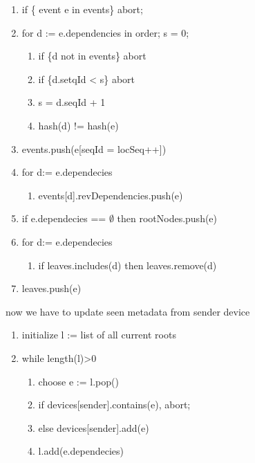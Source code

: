 \begin{enumerate}
    \item if \{ event e in events\} abort;
    \item for d := e.dependencies in order; s = 0;
    \begin{enumerate}
        \item if \{d not in events\} abort
        \item if \{d.setqId < s\} abort
        \item s = d.seqId + 1
        \item hash(d) != hash(e)
    \end{enumerate}
    \item events.push(e[seqId = locSeq++])
    \item for d:= e.dependecies
    \begin{enumerate}
        \item events[d].revDependencies.push(e)
    \end{enumerate}
    \item if e.dependecies == $\emptyset$ then rootNodes.push(e)
    \item for d:= e.dependecies
    \begin{enumerate}
        \item if leaves.includes(d) then leaves.remove(d)
    \end{enumerate} 
    \item leaves.push(e) 
\end{enumerate}

now we have to update seen metadata from sender device

\begin{enumerate}
    \item initialize l := list of all current roots
    \item while length(l)>0 
    \begin{enumerate}
        \item choose e := l.pop()
        \item if devices[sender].contains(e), abort;
        \item else devices[sender].add(e)
        \item l.add(e.dependecies)
    \end{enumerate}
\end{enumerate}

